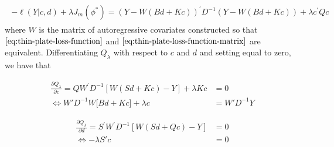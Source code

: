 \begin{align}
\begin{split} \label{eq:penalized-likelihood-vectorized} 
-\ell\left(Y \vert c,d\right) + \lambda J_m\left(\phi^*\right) = \left( Y - W \left( Bd + Kc \right) \right)^\prime D^{-1} \left( Y - W \left( Bd + Kc \right) \right) + \lambda c^\prime Q c 
\end{split}
\end{align} 
\bigskip
\noindent
 where $W$ is the matrix of autoregressive covariates constructed so that $\ref{eq:thin-plate-loss-function}$ and $\ref{eq:thin-plate-loss-function-matrix}$ are equivalent. 
\bigskip
Differentiating $Q_\lambda$ with respect to $c$ and $d$ and setting equal to zero, we have that 

\begin{align}
\frac{\partial Q_\lambda}{\partial c} = Q W^\prime D^{-1}\left[ W\left(Sd + Kc\right) - Y  \right] + \lambda Kc &= 0 \nonumber \\
\iff    W'D^{-1} W \bigg[ Bd + Kc \bigg] + \lambda c  &= W' D^{-1}Y \label{eq:normal-eq-1}
\end{align}
\noindent

\begin{align*}
\frac{\partial Q_\lambda}{\partial d} = S^\prime W^\prime D^{-1}\left[ W\left(Sd + Qc\right) - Y  \right] &=0 \nonumber \\
\iff   - \lambda S' c  &= 0  
\end{align*}
\bigskip
\noindent




